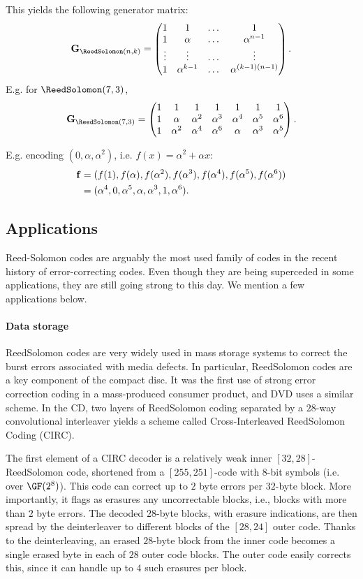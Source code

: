 \documentclass[a4paper, 11pt, openany]{book}
\begin{document}
This yields the following generator matrix:
\[
	{\bf G}_{\ReedSolomon(n,k)} = \begin{pmatrix}
	1 & 1 & \dots & 1\\
	1 & \alpha & \dots & \alpha^{n-1}\\
	\vdots & \vdots & \dots & \vdots\\
	1 & \alpha^{k-1} & \dots & \alpha^{(k-1)(n-1)}
	\end{pmatrix}.
\]
E.g. for $\ReedSolomon(7,3)$,
\[
	{\bf G}_{\ReedSolomon(7,3)} = \begin{pmatrix}
	1 & 1 & 1 & 1 & 1 & 1 & 1\\
	1 & \alpha & \alpha^2 & \alpha^3 & \alpha^4 & \alpha^5 & \alpha^6\\
	1 & \alpha^2 & \alpha^4 & \alpha^6 & \alpha & \alpha^3 & \alpha^5
	\end{pmatrix}.
\]

E.g. encoding $(0, \alpha, \alpha^2)$, i.e. $f(x) = \alpha^2 + \alpha x$:
\begin{align*}
	{\bf f} &= (f(1), f(\alpha), f(\alpha^2), f(\alpha^3), f(\alpha^4), f(\alpha^5), f(\alpha^6))\\
	&= (\alpha^4, 0, \alpha^5, \alpha, \alpha^3, 1, \alpha^6).
\end{align*}


\subsection{Applications}

Reed-Solomon codes are arguably the most used family of codes in the recent history of error-correcting codes. Even though they are being superceded in some applications, they are still going strong to this day. We mention a few applications below.

\paragraph{Data storage}
ReedSolomon codes are very widely used in mass storage systems to correct the burst errors associated with media defects. In particular, ReedSolomon codes are a key component of the compact disc. It was the first use of strong error correction coding in a mass-produced consumer product, and DVD uses a similar scheme. In the CD, two layers of ReedSolomon coding separated by a $28$-way convolutional interleaver yields a scheme called Cross-Interleaved ReedSolomon Coding (CIRC).

The first element of a CIRC decoder is a relatively weak inner $[32,28]$-ReedSolomon code, shortened from a $[255,251]$-code with $8$-bit symbols (i.e. over $\GF(2^8)$). This code can correct up to $2$ byte errors per $32$-byte block. More importantly, it flags as erasures any uncorrectable blocks, i.e., blocks with more than $2$ byte errors. The decoded $28$-byte blocks, with erasure indications, are then spread by the deinterleaver to different blocks of the $[28,24]$ outer code. Thanks to the deinterleaving, an erased $28$-byte block from the inner code becomes a single erased byte in each of $28$ outer code blocks. The outer code easily corrects this, since it can handle up to $4$ such erasures per block.
\end{document}
